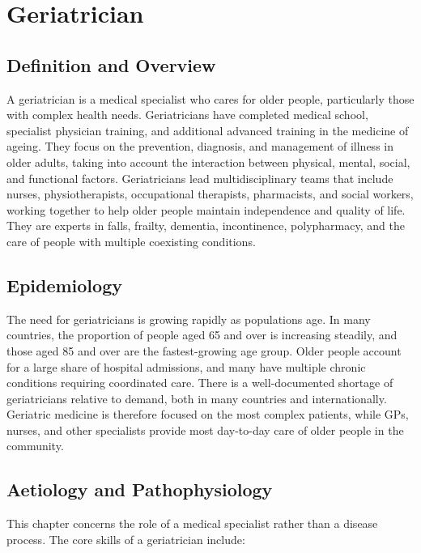 \chapter{Geriatrician}

\section*{Definition and Overview}
A geriatrician is a medical specialist who cares for older people, particularly those with complex health needs. Geriatricians have completed medical school, specialist physician training, and additional advanced training in the medicine of ageing. They focus on the prevention, diagnosis, and management of illness in older adults, taking into account the interaction between physical, mental, social, and functional factors. Geriatricians lead multidisciplinary teams that include nurses, physiotherapists, occupational therapists, pharmacists, and social workers, working together to help older people maintain independence and quality of life. They are experts in falls, frailty, dementia, incontinence, polypharmacy, and the care of people with multiple coexisting conditions.

\section*{Epidemiology}
The need for geriatricians is growing rapidly as populations age. In many countries, the proportion of people aged 65 and over is increasing steadily, and those aged 85 and over are the fastest-growing age group. Older people account for a large share of hospital admissions, and many have multiple chronic conditions requiring coordinated care. There is a well-documented shortage of geriatricians relative to demand, both in many countries and internationally. Geriatric medicine is therefore focused on the most complex patients, while GPs, nurses, and other specialists provide most day-to-day care of older people in the community.

\section*{Aetiology and Pathophysiology}
This chapter concerns the role of a medical specialist rather than a disease process. The core skills of a geriatrician include:

